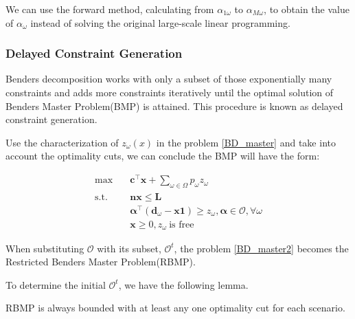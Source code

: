 
We can use the forward method, calculating from $\alpha_{1 \omega}$ to $\alpha_{M \omega}$, to obtain the value of $\alpha_{\omega}$ instead of solving the original large-scale linear programming.

\subsubsection{Delayed Constraint Generation}\label{bender_stage}
Benders decomposition works with only a subset of those exponentially many constraints and adds more constraints iteratively until the optimal solution of Benders Master Problem(BMP) is attained. This procedure is known as delayed constraint generation.

Use the characterization of $z_{\omega}(x)$ in the problem \eqref{BD_master} and take into account the optimality cuts, we can conclude the BMP will have the form:

\begin{equation}\label{BD_master2}
  \begin{aligned}
    \max \quad & \mathbf{c}^{\intercal} \mathbf{x} + \sum_{\omega \in \Omega} p_{\omega} z_{\omega} \\
    \text {s.t.} \quad & \mathbf{n} \mathbf{x} \leq \mathbf{L} \\
    & \bm{\alpha}^{\intercal}(\mathbf{d}_{\omega}- \mathbf{x} \mathbf{1}) \geq z_{\omega}, \bm{\alpha} \in \mathcal{O}, \forall \omega \\
     & \mathbf{x} \geq 0, z_{\omega} ~\text{is free}
  \end{aligned}
\end{equation}

When substituting $\mathcal{O}$ with its subset, $\mathcal{O}^{t}$, the problem \eqref{BD_master2} becomes the Restricted Benders Master Problem(RBMP). 

To determine the initial $\mathcal{O}^{t}$, we have the following lemma.

\begin{lem}\label{one_ep_feasible}
RBMP is always bounded with at least any one optimality cut for each scenario.
\end{lem}

